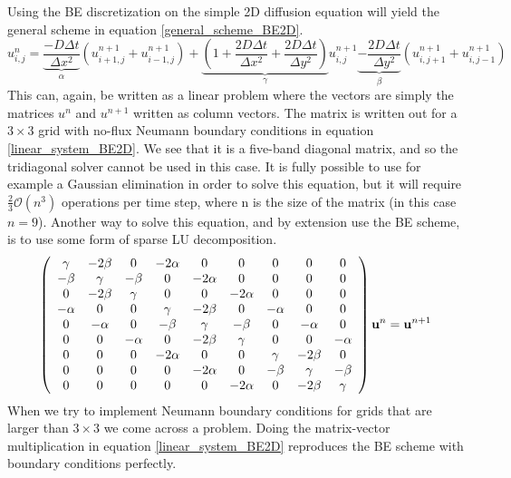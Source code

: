 Using the BE discretization on the simple 2D diffusion equation will yield the general scheme in equation \ref{general_scheme_BE2D}.
\begin{equation}\label{general_scheme_BE2D}
 u^{n}_{i,j} = \underbrace{\frac{-D\Delta t}{\Delta x^2}}_{\alpha}\left(u^{n+1}_{i+1,j}+u^{n+1}_{i-1,j}\right) +
 \underbrace{\left(1+\frac{2D\Delta t}{\Delta x^2} +\frac{2D\Delta t}{\Delta y^2}\right)}_{\gamma}u^{n+1}_{i,j} 
 \underbrace{-\frac{2D\Delta t}{\Delta y^2}}_{\beta}\left(u^{n+1}_{i,j+1}+u^{n+1}_{i,j-1}\right)
\end{equation}
This can, again, be written as a linear problem where the vectors are simply the matrices $u^n$ and $u^{n+1}$ written as column vectors. 
The matrix is written out for a $3\times3$ grid with no-flux Neumann boundary conditions in equation \ref{linear_system_BE2D}. 
We see that it is a five-band diagonal matrix, and so the tridiagonal solver cannot be used in this case. It is fully possible to use for example a Gaussian elimination in order to solve this equation, but it will require $\frac{2}{3}\mathcal{O}(n^3)$ operations per time step, where n is the size of the matrix (in this case $n=9$). 
Another way to solve this equation, and by extension use the BE scheme, is to use some form of sparse LU decomposition.
\begin{align}\label{linear_system_BE2D}
  \left(\begin{array}{c c c c c c c c c}
        \gamma & -2\beta &0 &-2\alpha &0 &0 &0 &0 &0\\
        -\beta & \gamma & -\beta &0 &-2\alpha &0 &0 &0 &0\\
        0&-2\beta & \gamma & 0 & 0 & -2\alpha &0&0&0\\
        -\alpha& 0&0 & \gamma & -2\beta & 0 & -\alpha &0&0\\
        0& -\alpha&0&-\beta & \gamma & -\beta & 0 & -\alpha &0\\
        0& 0& -\alpha&0&-2\beta & \gamma & 0 & 0 &-\alpha\\
        0& 0 &0 &-2\alpha &0&0 & \gamma & -2\beta&0\\
        0& 0 &0 &0 &-2\alpha&0&-\beta & \gamma &-\beta\\
         0&0 &0 &0&0 &-2\alpha&0&-2\beta & \gamma
       \end{array}\right)\mathbf{u}^{n} = \mathbf{u}^{n+1}
\end{align}
When we try to implement Neumann boundary conditions for grids that are larger than $3\times3$ we come across a problem. 
Doing the matrix-vector multiplication in equation \ref{linear_system_BE2D} reproduces the BE scheme with boundary conditions perfectly. 
